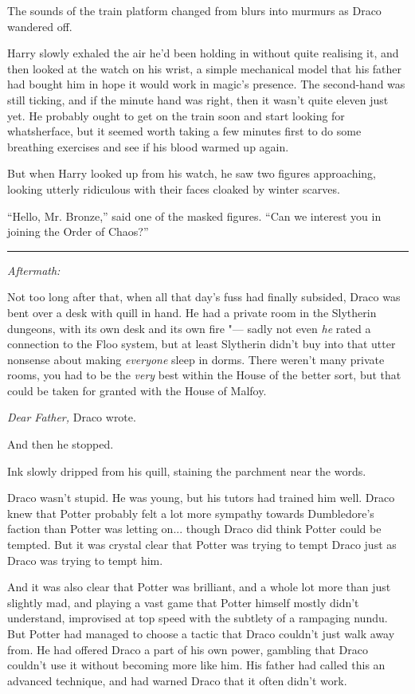 The sounds of the train platform changed from blurs into murmurs as
Draco wandered off.

Harry slowly exhaled the air he'd been holding in without quite
realising it, and then looked at the watch on his wrist, a simple
mechanical model that his father had bought him in hope it would work in
magic's presence. The second-hand was still ticking, and if the minute
hand was right, then it wasn't quite eleven just yet. He probably ought
to get on the train soon and start looking for whatsherface, but it
seemed worth taking a few minutes first to do some breathing exercises
and see if his blood warmed up again.

But when Harry looked up from his watch, he saw two figures approaching,
looking utterly ridiculous with their faces cloaked by winter scarves.

``Hello, Mr. Bronze,'' said one of the masked figures. ``Can we interest
you in joining the Order of Chaos?''

\begin{center}\rule{3in}{0.4pt}\end{center}

\emph{Aftermath:}

Not too long after that, when all that day's fuss had finally subsided,
Draco was bent over a desk with quill in hand. He had a private room in
the Slytherin dungeons, with its own desk and its own fire "--- sadly not
even \emph{he} rated a connection to the Floo system, but at least
Slytherin didn't buy into that utter nonsense about making
\emph{everyone} sleep in dorms. There weren't many private rooms, you
had to be the \emph{very} best within the House of the better sort, but
that could be taken for granted with the House of Malfoy.

\emph{Dear Father,} Draco wrote.

And then he stopped.

Ink slowly dripped from his quill, staining the parchment near the
words.

Draco wasn't stupid. He was young, but his tutors had trained him well.
Draco knew that Potter probably felt a lot more sympathy towards
Dumbledore's faction than Potter was letting on... though Draco did
think Potter could be tempted. But it was crystal clear that Potter was
trying to tempt Draco just as Draco was trying to tempt him.

And it was also clear that Potter was brilliant, and a whole lot more
than just slightly mad, and playing a vast game that Potter himself
mostly didn't understand, improvised at top speed with the subtlety of a
rampaging nundu. But Potter had managed to choose a tactic that Draco
couldn't just walk away from. He had offered Draco a part of his own
power, gambling that Draco couldn't use it without becoming more like
him. His father had called this an advanced technique, and had warned
Draco that it often didn't work.

